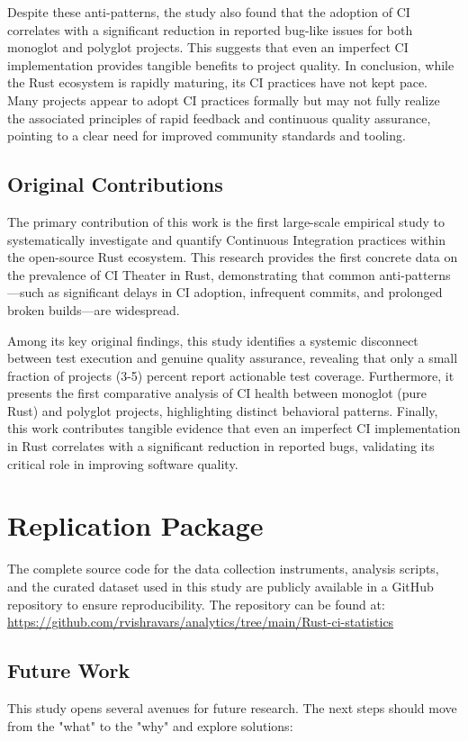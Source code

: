 \documentclass[11pt]{article}
\begin{document}
Despite these anti-patterns, the study also found that the adoption of CI correlates with a significant reduction in reported bug-like issues for both monoglot and polyglot projects. This suggests that even an imperfect CI implementation provides tangible benefits to project quality. In conclusion, while the Rust ecosystem is rapidly maturing, its CI practices have not kept pace. Many projects appear to adopt CI practices formally but may not fully realize the associated principles of rapid feedback and continuous quality assurance, pointing to a clear need for improved community standards and tooling.

\subsection{Original Contributions}

The primary contribution of this work is the first large-scale empirical study to systematically investigate and quantify Continuous Integration practices within the open-source Rust ecosystem. This research provides the first concrete data on the prevalence of CI Theater in Rust, demonstrating that common anti-patterns—such as significant delays in CI adoption, infrequent commits, and prolonged broken builds—are widespread.

Among its key original findings, this study identifies a systemic disconnect between test execution and genuine quality assurance, revealing that only a small fraction of projects (3-5) percent report actionable test coverage. Furthermore, it presents the first comparative analysis of CI health between monoglot (pure Rust) and polyglot projects, highlighting distinct behavioral patterns. Finally, this work contributes tangible evidence that even an imperfect CI implementation in Rust correlates with a significant reduction in reported bugs, validating its critical role in improving software quality.

\appendix
\section{Replication Package}
The complete source code for the data collection instruments, analysis scripts, and the curated dataset used in this study are publicly available in a GitHub repository to ensure reproducibility. The repository can be found at: \url{https://github.com/rvishravars/analytics/tree/main/Rust-ci-statistics}

\subsection{Future Work}
This study opens several avenues for future research. The next steps should move from the "what" to the "why" and explore solutions:
\end{document}
